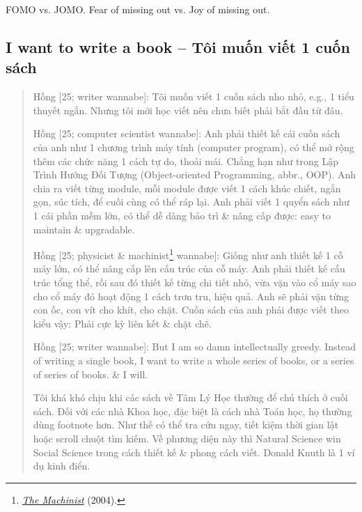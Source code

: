 \documentclass[12pt]{article}
\begin{document}
FOMO vs. JOMO. Fear of missing out vs. Joy of missing out.

\subsection{I want to write a book -- Tôi muốn viết 1 cuốn sách}

\begin{quote}
	{\sf Hồng [25; writer wannabe]}: Tôi muốn viết 1 cuốn sách nho nhỏ, e.g., 1 tiểu thuyết ngắn. Nhưng tôi mới học viết nên chưa biết phải bắt đầu từ đâu.
	
	{\sf Hồng [25; computer scientist wannabe]}: Anh phải thiết kế cái cuốn sách của anh như 1 chương trình máy tính (computer program), có thể mở rộng thêm các chức năng 1 cách tự do, thoải mái. Chẳng hạn như trong Lập Trình Hướng Đối Tượng (Object-oriented Programming, abbr., OOP). Anh chia ra viết từng module, mỗi module được viết 1 cách khúc chiết, ngắn gọn, súc tích, để cuối cùng có thể ráp lại. Anh phải viết 1 quyển sách như 1 cái phần mềm lớn, có thể dễ dàng bảo trì \& nâng cấp được: easy to maintain \& upgradable.
	
	{\sf Hồng [25; physicist \& machinist\footnote{\href{https://www.imdb.com/title/tt0361862/}{\it The Machinist} (2004).} wannabe]}: Giống như anh thiết kế 1 cỗ máy lớn, có thể nâng cấp lên cấu trúc của cỗ máy. Anh phải thiết kế cấu trúc tổng thể, rồi sau đó thiết kế từng chi tiết nhỏ, vừa vặn vào cổ máy sao cho cổ máy đó hoạt động 1 cách trơn tru, hiệu quả. Anh sẽ phải vặn từng con ốc, con vít cho khít, cho chặt. Cuốn sách của anh phải được viết theo kiểu vậy: Phải cực kỳ liên kết \& chặt chẽ.
	
	{\sf Hồng [25; writer wannabe]}: But I am so damn intellectually greedy. Instead of writing a single book, I want to write a whole series of books, or a series of series of books. \& I will.
	
	Tôi khá khó chịu khi các sách về Tâm Lý Học thường để chú thích ở cuối sách. Đối với các nhà Khoa học, đặc biệt là cách nhà Toán học, họ thường dùng footnote hơn. Như thế có thể tra cứu ngay, tiết kiệm thời gian lật hoặc scroll chuột tìm kiếm. Về phương diện này thì Natural Science win Social Science trong cách thiết kế \& phong cách viết. {\sc Donald Knuth} là 1 ví dụ kinh điển.
\end{quote}

\end{document}
